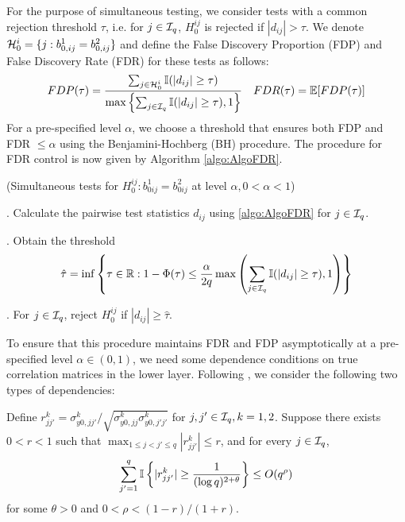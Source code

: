 For the purpose of simultaneous testing, we consider tests with a common rejection threshold $\tau$, i.e. for $j \in {\cal{I}}_q$, $H_0^{ij}$ is rejected if $| d_{ij} | > \tau$. We denote ${\cal{H}}_0^i = \{ j: b_{0,ij}^1 = b_{0,ij}^2 \}$ and define the False Discovery Proportion (FDP) and False Discovery Rate (FDR) for these tests as follows:
%
$$
FDP (\tau) = \frac{\sum_{j \in {\cal{H}}_0^i} {\mathbb{I}}( |d_{ij}| \geq \tau)}{\max\left\{
\sum_{j \in {\cal{I}}_q} {\mathbb{I}}( |d_{ij}| \geq \tau), 1\right\} }\quad
FDR (\tau) = {\mathbb{E}} [ FDP (\tau) ]
$$
%
For a pre-specified level $\alpha$, we choose a threshold that ensures both FDP and FDR $\leq \alpha$ using the Benjamini-Hochberg (BH) procedure. %
The procedure for FDR control is now given by Algorithm \ref{algo:AlgoFDR}.

\begin{Algorithm}\label{algo:AlgoFDR}
(Simultaneous tests for $H_0^{ij}: b_{0 ij}^1 = b_{0 ij}^2$ at level $\alpha, 0< \alpha< 1$)

. Calculate the pairwise test statistics $d_{ij}$ using \eqref{algo:AlgoFDR} for $j \in {\cal{I}}_q$.

. Obtain the threshold
%
$$
\hat \tau = \inf \left\{\tau \in {\mathbb{R}}: 1 - \Phi(\tau) \leq \frac{\alpha}{2 q}
\max \left( \sum_{j \in {\cal{I}}_q} {\mathbb{I}}( |d_{ij}| \geq \tau), 1 \right) \right\}
$$
%

. For $j \in {\cal{I}}_q$, reject $H_0^{ij}$ if $|d_{ij}| \geq \hat \tau$.
\end{Algorithm}

To ensure that this procedure maintains FDR and FDP asymptotically at a pre-specified level $\alpha \in (0,1)$, we need some dependence conditions on true correlation matrices in the lower layer. Following \cite{LiuShao14}, we consider the following two types of dependencies:

 Define $r_{jj'}^k = \sigma_{y0,jj'}^k /\sqrt{\sigma_{y0,jj}^k \sigma_{y0,j'j'}^k}$ for $j,j' \in {\cal{I}}_q, k = 1,2$. Suppose there exists $0 < r < 1$ such that $\max_{1 \leq j < j' \leq q} | r_{jj'}^k | \leq r$, and for every $j \in {\cal{I}}_q$,
%
$$
\sum_{j'=1}^q {\mathbb{I}} \left\{ |r_{jj'}^k| \geq \frac{1}{(\log q)^{2 + \theta}} \right\} \leq O(q^\rho)
$$
%
for some $\theta > 0$ and $0 < \rho < (1-r)/(1+r)$.

